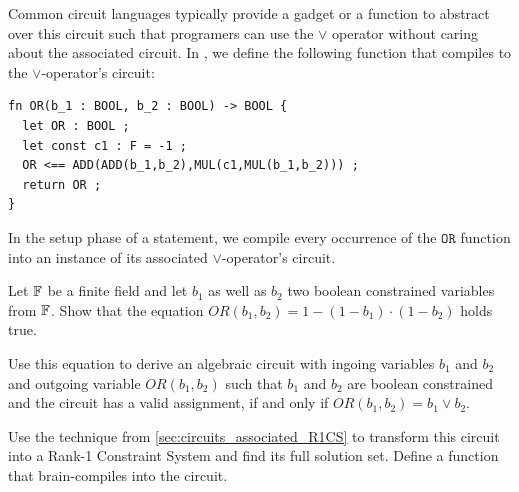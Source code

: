 Common circuit languages typically provide a gadget or a function to abstract over this circuit such that programers can use the $\vee$ operator without caring about the associated circuit. In , we define the following function that compiles to the $\vee$-operator's circuit:
\begin{lstlisting}
fn OR(b_1 : BOOL, b_2 : BOOL) -> BOOL {
  let OR : BOOL ;
  let const c1 : F = -1 ;
  OR <== ADD(ADD(b_1,b_2),MUL(c1,MUL(b_1,b_2))) ;
  return OR ;
}
\end{lstlisting}
In the setup phase of a statement, we compile every occurrence of the $\mathtt{OR}$ function into an instance of its associated $\vee$-operator's circuit.
\begin{exercise} Let $\mathbb{F}$ be a finite field and let $b_1$ as well as $b_2$ two boolean constrained variables from $\mathbb{F}$. Show that the equation 
$OR(b_1,b_2) = 1 - (1 - b_1)\cdot (1 - b_2)$ holds true.

Use this equation to derive an algebraic circuit with ingoing variables $b_1$ and $b_2$ and outgoing variable $OR(b_1,b_2)$ such that $b_1$ and $b_2$ are boolean constrained and the circuit has a valid assignment, if and only if $OR(b_1,b_2) = b_1 \vee b_2$.  

Use the technique from \ref{sec:circuits_associated_R1CS} to transform this circuit into a Rank-1 Constraint System and find its full solution set. Define a  function that brain-compiles into the circuit. 

\end{exercise}
